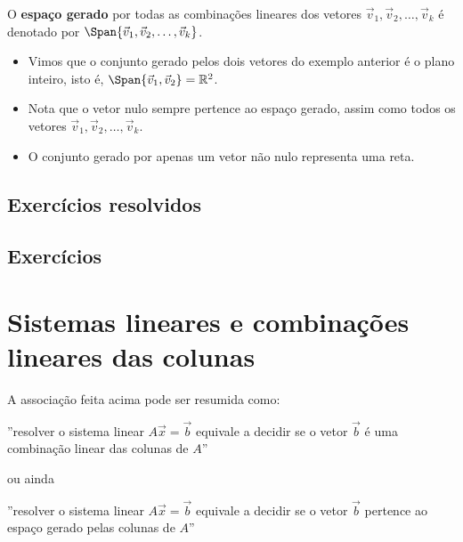 \documentclass[../livro.tex]{subfiles}  %
\begin{document}
O \textbf{espaço gerado} por todas as combinações lineares dos vetores $\vec{v}_1, \vec{v}_2, \dots, \vec{v}_k$ é denotado por $\Span \{ \vec{v}_1, \vec{v}_2, \dots, \vec{v}_k \}$.

\begin{itemize}
\item Vimos que o conjunto gerado pelos dois vetores do exemplo anterior é o plano inteiro, isto é, $\Span \{ \vec{v}_1, \vec{v}_2 \} = \mathbb{R}^2$.
\item Nota que o vetor nulo sempre pertence ao espaço gerado, assim como todos os vetores $\vec{v}_1, \vec{v}_2, \dots, \vec{v}_k$.
\item O conjunto gerado por apenas um vetor não nulo representa uma reta.
\end{itemize}

\subsection*{Exercícios resolvidos}

\construirExeresol

\subsection*{Exercícios}

\construirExer


\section{Sistemas lineares e combinações lineares das colunas}

A associação feita acima pode ser resumida como:
\begin{center}
  ''resolver o sistema linear $A \vec{x} = \vec{b}$ equivale a decidir
  se o vetor $\vec{b}$ é uma combinação linear das colunas de $A$''
\end{center}
ou ainda
\begin{center}
  ''resolver o sistema linear $A \vec{x} = \vec{b}$ equivale a decidir se o vetor $\vec{b}$ pertence ao espaço gerado pelas colunas de $A$''
\end{center}
\end{document}
